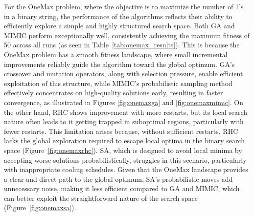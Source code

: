 For the OneMax problem, where the objective is to maximize the number of 1's in a binary string, the performance of the algorithms reflects their ability to efficiently explore a simple and highly structured search space. Both GA and MIMIC perform exceptionally well, consistently achieving the maximum fitness of 50 across all runs (as seen in Table~\ref{tab:onemax_results}). This is because the OneMax problem has a smooth fitness landscape, where small incremental improvements reliably guide the algorithm toward the global optimum. GA's crossover and mutation operators, along with selection pressure, enable efficient exploitation of this structure, while MIMIC's probabilistic sampling method effectively concentrates on high-quality solutions early, resulting in faster convergence, as illustrated in Figures \ref{fig:onemaxga} and \ref{fig:onemaxmimic}. On the other hand, RHC shows improvement with more restarts, but its local search nature often leads to it getting trapped in suboptimal regions, particularly with fewer restarts. This limitation arises because, without sufficient restarts, RHC lacks the global exploration required to escape local optima in the binary search space (Figure~\ref{fig:onemaxrhc}). SA, which is designed to avoid local minima by accepting worse solutions probabilistically, struggles in this scenario, particularly with inappropriate cooling schedules. Given that the OneMax landscape provides a clear and direct path to the global optimum, SA’s probabilistic moves add unnecessary noise, making it less efficient compared to GA and MIMIC, which can better exploit the straightforward nature of the search space (Figure~\ref{fig:onemaxsa}).
